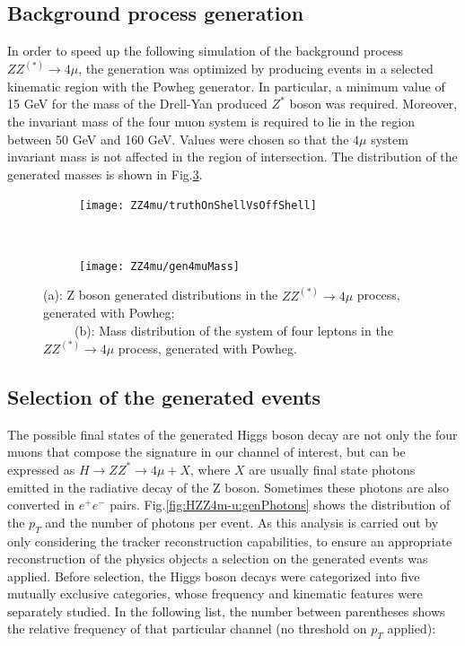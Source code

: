 \documentclass[a4paper,twoside,12pt]{book}
\begin{document}
\subsection{Background process generation}\label{physics:bkgGeneration}
In order to speed up the following simulation of the background process $ZZ^{(*)} \rightarrow 4\mu$, the generation was optimized by
producing events in a selected kinematic region with the Powheg generator\cite{Powheg}. In particular, a minimum value of 15 GeV for the mass of
the Drell-Yan produced $Z^*$ boson was required. Moreover, the invariant mass of the four muon system is required 
to lie in the region between 50 GeV and 160 GeV. Values were chosen so that the $4\mu$ system invariant mass is not affected in the region of intersection. The distribution of the generated masses is shown 
in Fig.\ref{fig:ZZ4mu:genMasses}.\\

\begin{figure}
\begin{subfigure}{\linewidth}
\centering
\texttt{[image: ZZ4mu/truthOnShellVsOffShell]}
\caption{}
\label{fig:ZZ4mu:truthOnShellVsOffShell}
\end{subfigure}\\[1 ex]
\begin{subfigure}{\linewidth}
\centering
\texttt{[image: ZZ4mu/gen4muMass]}
\caption{}
\label{fig:ZZ4mu:gen4muMass}
\end{subfigure}
\caption{(a): Z boson generated distributions in the $ZZ^{(*)} \rightarrow 4\mu$ process, generated with Powheg;\\
\ \ \ \ \ (b): Mass distribution of the system of four leptons in the $ZZ^{(*)} \rightarrow 4\mu$ process, generated with Powheg.}
\label{fig:ZZ4mu:genMasses}
\end{figure}


\subsection{Selection of the generated events}
The possible final states of the generated Higgs boson decay are not only the four muons that 
compose the signature in our channel of interest, but can be expressed as $H \rightarrow
ZZ^* \rightarrow 4\mu + X$, where $X$ are usually final state photons emitted in the
radiative decay of the Z boson. Sometimes these photons are also converted in $e^{+}e^{-}$ pairs. Fig.\ref{fig:HZZ4m-u:genPhotons} shows the distribution of the $p_{T}$ and the number
of photons per event. 
 As this analysis is carried out by only considering the tracker reconstruction capabilities, to ensure 
an appropriate reconstruction of the physics objects a selection on the 
generated events was applied. Before selection, the Higgs boson decays were categorized into five 
mutually exclusive categories, whose frequency and kinematic features were separately 
studied. In the following list, the number between parentheses shows the relative frequency
of that particular channel (no threshold on $p_{T}$ applied):
\end{document}
